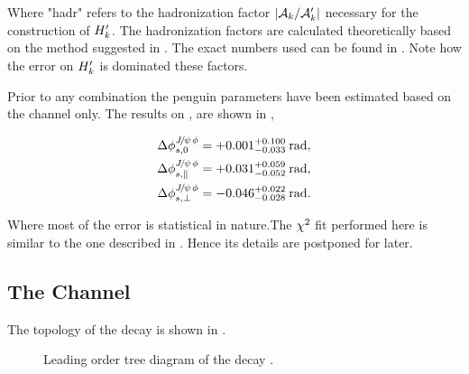 \noindent Where "hadr" refers to the hadronization factor $|\mathcal{A}_{k}/\mathcal{A}_{k}'|$ necessary for the construction of $H_{k}'$.
The hadronization factors are calculated theoretically based on the method suggested in \cite{eff-hamiltonian-bs-syst}.
The exact numbers used can be found in \cite{DeBruyn-thesis}. Note how the error on $H_{k}'$ is dominated these factors.


Prior to any combination the penguin parameters have been estimated based on the \BsJpsiKst channel only.
The results on \cite{bsjpsikst-paper}, are shown in ,

\begin{subequations}
  \label{delta_phis_jpsikst}
  \begin{align}
    \Delta\phi^{{J\mskip -3mu/\mskip -2mu\psi\mskip 2mu}\phi}_{s,{0}}         & = +0.001^{+0.100}_{-0.033} \:\text{rad},\\
    \Delta\phi^{{J\mskip -3mu/\mskip -2mu\psi\mskip 2mu}\phi}_{s,{\parallel}} & = +0.031^{+0.059}_{-0.052} \:\text{rad},\\
    \Delta\phi^{{J\mskip -3mu/\mskip -2mu\psi\mskip 2mu}\phi}_{s,{\perp}}     & = -0.046^{+0.022}_{-0.028} \:\text{rad}.
  \end{align}
\end{subequations}

\noindent Where most of the error is statistical in nature.The $\chi^2$ fit performed here is similar
to the one described in . Hence its details are postponed for later.


\subsection{The \BdJpsiRho Channel}
\label{bsjpsirho_chanell}

The topology of the \BdJpsiRho decay is shown in .

\begin{figure}[h]
  \centering
  \scalebox{0.9}{\sffamily }
  \caption{Leading order tree diagram of the decay \BdJpsiRho.}
  \label{bs2jpsirho_diagram}
\end{figure}

